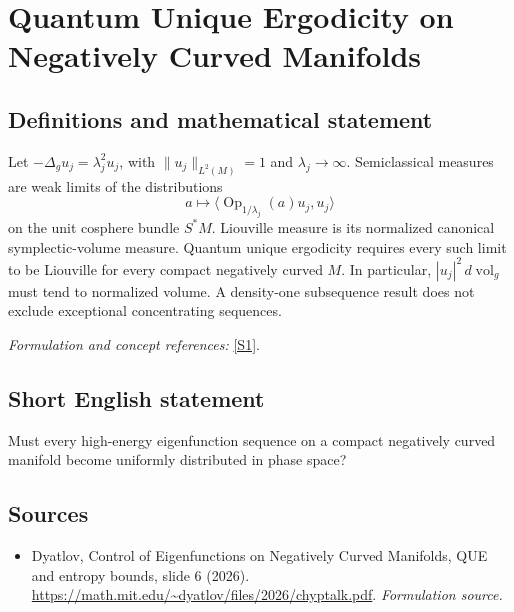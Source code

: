 \documentclass[11pt]{article}
\begin{document}
\section*{\texorpdfstring{Quantum Unique Ergodicity on Negatively Curved Manifolds}{Quantum Unique Ergodicity on Negatively Curved Manifolds}}\label{112}
\subsection{Definitions and mathematical statement}
Let $-\Delta_g u_j=\lambda_j^2u_j$, with $\|u_j\|_{L^2(M)}=1$ and $\lambda_j\to\infty$. Semiclassical measures are weak limits of the distributions
\[
 a\longmapsto\langle\operatorname{Op}_{1/\lambda_j}(a)u_j,u_j\rangle
\]
on the unit cosphere bundle $S^*M$. Liouville measure is its normalized canonical symplectic-volume measure. Quantum unique ergodicity requires every such limit to be Liouville for every compact negatively curved $M$. In particular, $|u_j|^2\,d\operatorname{vol}_g$ must tend to normalized volume. A density-one subsequence result does not exclude exceptional concentrating sequences.
\par\smallskip\textit{Formulation and concept references:} \href{https://math.mit.edu/~dyatlov/files/2026/chyptalk.pdf}{[S1]}.

\subsection{Short English statement}
Must every high-energy eigenfunction sequence on a compact negatively curved manifold become uniformly distributed in phase space?
\subsection{Sources}
\begin{itemize}
\item[S1]Dyatlov, Control of Eigenfunctions on Negatively Curved Manifolds, QUE and entropy bounds, slide 6 (2026).
\url{https://math.mit.edu/~dyatlov/files/2026/chyptalk.pdf}.
\textit{Formulation source.}
\end{itemize}
\end{document}
